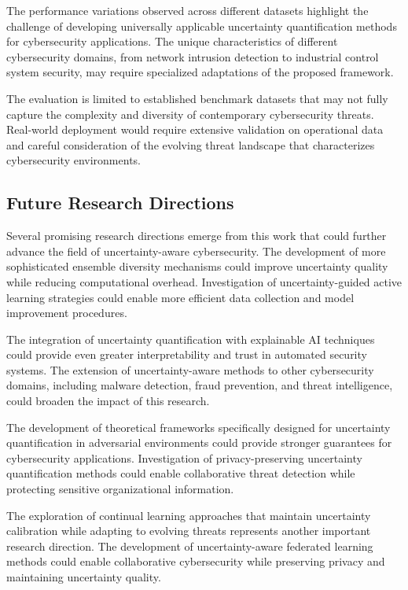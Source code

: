 \documentclass[journal]{IEEEtran}
\begin{document}
The performance variations observed across different datasets highlight the challenge of developing universally applicable uncertainty quantification methods for cybersecurity applications. The unique characteristics of different cybersecurity domains, from network intrusion detection to industrial control system security, may require specialized adaptations of the proposed framework.

The evaluation is limited to established benchmark datasets that may not fully capture the complexity and diversity of contemporary cybersecurity threats. Real-world deployment would require extensive validation on operational data and careful consideration of the evolving threat landscape that characterizes cybersecurity environments.

\subsection{Future Research Directions}

Several promising research directions emerge from this work that could further advance the field of uncertainty-aware cybersecurity. The development of more sophisticated ensemble diversity mechanisms could improve uncertainty quality while reducing computational overhead. Investigation of uncertainty-guided active learning strategies could enable more efficient data collection and model improvement procedures.

The integration of uncertainty quantification with explainable AI techniques could provide even greater interpretability and trust in automated security systems. The extension of uncertainty-aware methods to other cybersecurity domains, including malware detection, fraud prevention, and threat intelligence, could broaden the impact of this research.

The development of theoretical frameworks specifically designed for uncertainty quantification in adversarial environments could provide stronger guarantees for cybersecurity applications. Investigation of privacy-preserving uncertainty quantification methods could enable collaborative threat detection while protecting sensitive organizational information.

The exploration of continual learning approaches that maintain uncertainty calibration while adapting to evolving threats represents another important research direction. The development of uncertainty-aware federated learning methods could enable collaborative cybersecurity while preserving privacy and maintaining uncertainty quality.
\end{document}
